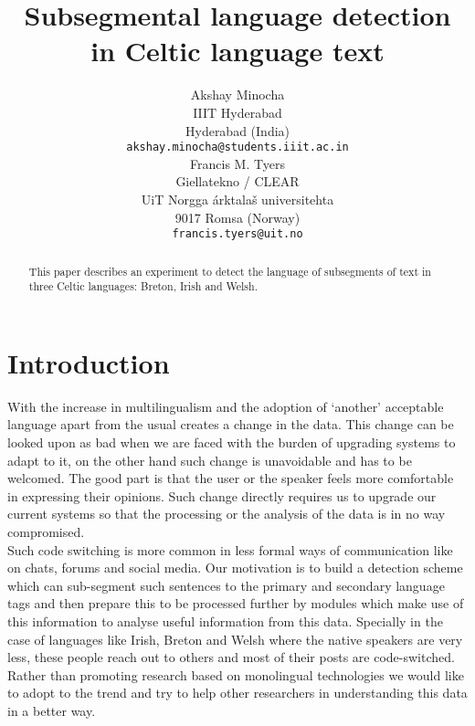 \documentclass[11pt]{article}
\title{Subsegmental language detection in Celtic language text}
\author{Akshay Minocha \\
  IIIT Hyderabad  \\
  Hyderabad (India) \\
  {\small {\tt akshay.minocha@students.iiit.ac.in}} \\\And
  Francis M. Tyers \\
  Giellatekno / CLEAR \\
  UiT Norgga \'arktala\v{s} universitehta  \\
  9017 Romsa (Norway) \\
  {\small {\tt francis.tyers@uit.no}} \\}
\date{}
\begin{document}
\maketitle
\begin{abstract}
  This paper describes an experiment to detect the language of subsegments
  of text in three Celtic languages: Breton, Irish and Welsh. 
\end{abstract}

\section{Introduction}
\label{intro}
With the increase in multilingualism and the adoption of ‘another’ acceptable language apart from the usual creates a change in the data. This change can be looked upon as bad when we are faced with the burden of upgrading systems to adapt to it, on the other hand such change is 
unavoidable and has to be welcomed. The good part is that the user or the speaker feels more comfortable in expressing their opinions. Such change directly requires us to upgrade our current systems \cite{fung2008multilingual} so that the processing or the analysis of the data is in no way compromised.\\
   Such code switching is more common in less formal ways of communication like on chats, forums and social media. Our motivation is to build a detection scheme which can sub-segment such sentences to the primary and secondary language tags and then prepare this to be processed further by modules which make use of this information to analyse useful information from this data. Specially in the case of languages like Irish, Breton and Welsh where the native speakers are very less, these people reach out to others and most of their posts are code-switched. Rather than promoting research based on monolingual technologies we would like to adopt to the trend and try to help other researchers in understanding this data in a better way.

\cite{lyu2006}
\end{document}
